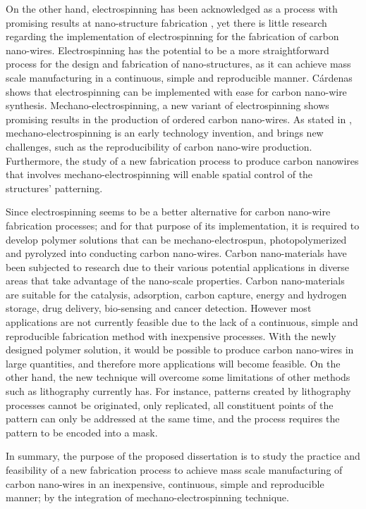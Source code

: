 On the other hand, electrospinning has been acknowledged as a process with promising results at nano-structure fabrication \cite{Boer2014}, yet there is little research regarding the implementation of electrospinning for the fabrication of carbon nano-wires. Electrospinning has the potential to be a more straightforward process for the design and fabrication of nano-structures, as it can achieve mass scale manufacturing in a continuous, simple and reproducible manner. Cárdenas \cite{Cardenas2017} shows that electrospinning can be implemented with ease for carbon nano-wire synthesis. Mechano-electrospinning, a new variant of electrospinning shows promising results in the production of ordered carbon nano-wires. As stated in \cite{Cardenas2017}, mechano-electrospinning is an early technology invention, and brings new challenges, such as the reproducibility of carbon nano-wire production. Furthermore, the study of a new fabrication process to produce carbon nanowires that involves mechano-electrospinning will enable spatial control of the structures' patterning.

Since electrospinning seems to be a better alternative for carbon nano-wire fabrication processes; and for that purpose of its implementation, it is required to develop polymer solutions that can be mechano-electrospun, photopolymerized and pyrolyzed into conducting carbon nano-wires. Carbon nano-materials have been subjected to research due to their various potential applications in diverse areas that take advantage of the nano-scale properties. \cite{Siddiqui2019} Carbon nano-materials are suitable for the catalysis, adsorption, carbon capture, energy and hydrogen storage, drug delivery, bio-sensing and cancer detection. \cite{Siddiqui2019} However most applications are not currently feasible due to the lack of a continuous, simple and reproducible fabrication method with inexpensive processes. With the newly designed polymer solution, it would be possible to produce carbon nano-wires in large quantities, and therefore more applications will become feasible. On the other hand, the new technique will overcome some limitations of other methods such as lithography currently has. For instance, patterns created by lithography processes cannot be originated, only replicated, all constituent points of the pattern can only be addressed at the same time, and the process requires the pattern to be encoded into a mask. \cite{Landis2011}

In summary, the purpose of the proposed dissertation is to study the practice and feasibility of a new fabrication process to achieve mass scale manufacturing of carbon nano-wires in an inexpensive, continuous, simple and reproducible manner; by the integration of mechano-electrospinning technique.






